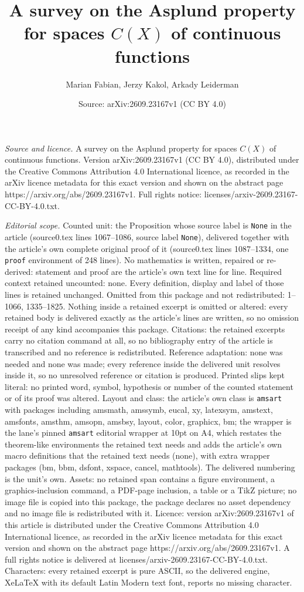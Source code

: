 \documentclass[10pt,a4paper]{amsart}
\title[A survey on the Asplund property for spaces $C(X)$ of contin]{A survey on the Asplund property for spaces $C(X)$ of continuous functions}
\author{Marian Fabian, Jerzy Kakol, Arkady Leiderman}
\date{Source: arXiv:2609.23167v1 (CC BY 4.0)}
\begin{document}
\maketitle

\noindent\emph{Source and licence.} A survey on the Asplund property for spaces $C(X)$ of continuous functions. Version arXiv:2609.23167v1 (CC BY 4.0), distributed under the Creative Commons Attribution 4.0 International licence, as recorded in the arXiv licence metadata for this exact version and shown on the abstract page https://arxiv.org/abs/2609.23167v1. Full rights notice: licenses/arxiv-2609.23167-CC-BY-4.0.txt.\par\smallskip

\noindent\textit{Editorial scope.} Counted unit: the Proposition whose source label is \texttt{None} in the article (source0.tex lines 1067--1086, source label \texttt{None}), delivered together with the article's own complete original proof of it (source0.tex lines 1087--1334, one \texttt{proof} environment of 248 lines). No mathematics is written, repaired or re-derived: statement and proof are the article's own text line for line. Required context retained uncounted: none. Every definition, display and label of those lines is retained unchanged. Omitted from this package and not redistributed: 1--1066, 1335--1825. Nothing inside a retained excerpt is omitted or altered: every retained body is delivered exactly as the article's lines are written, so no omission receipt of any kind accompanies this package. Citations: the retained excerpts carry no citation command at all, so no bibliography entry of the article is transcribed and no reference is redistributed. Reference adaptation: none was needed and none was made; every reference inside the delivered unit resolves inside it, so no unresolved reference or citation is produced. Printed slips kept literal: no printed word, symbol, hypothesis or number of the counted statement or of its proof was altered. Layout and class: the article's own class is \texttt{amsart} with packages including amsmath, amssymb, eucal, xy, latexsym, amstext, amsfonts, amsthm, amsopn, amsbsy, layout, color, graphicx, bm; the wrapper is the lane's pinned \texttt{amsart} editorial wrapper at 10pt on A4, which restates the theorem-like environments the retained text needs and adds the article's own macro definitions that the retained text needs (none), with extra wrapper packages (bm, bbm, dsfont, xspace, cancel, mathtools). The delivered numbering is the unit's own. Assets: no retained span contains a figure environment, a graphics-inclusion command, a PDF-page inclusion, a table or a TikZ picture; no image file is copied into this package, the package declares no asset dependency and no image file is redistributed with it. Licence: version arXiv:2609.23167v1 of this article is distributed under the Creative Commons Attribution 4.0 International licence, as recorded in the arXiv licence metadata for this exact version and shown on the abstract page https://arxiv.org/abs/2609.23167v1. A full rights notice is delivered at licenses/arxiv-2609.23167-CC-BY-4.0.txt. Characters: every retained excerpt is pure ASCII, so the delivered engine, XeLaTeX with its default Latin Modern text font, reports no missing character.
\end{document}
